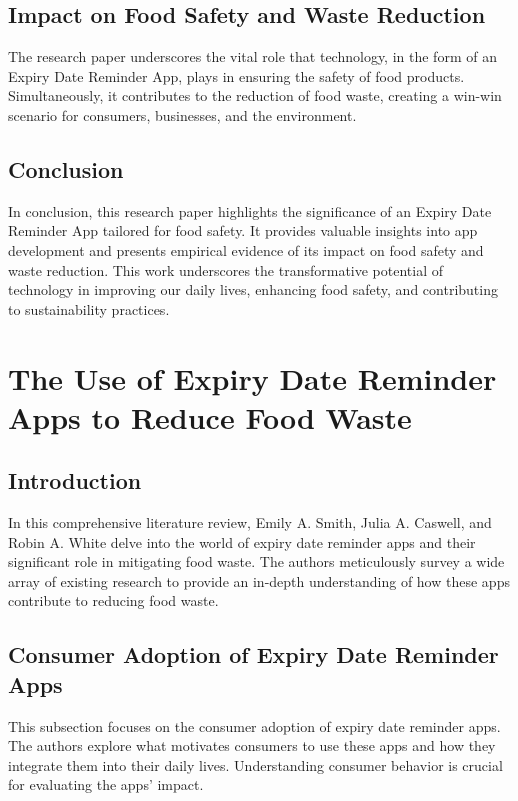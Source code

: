 \subsection{Impact on Food Safety and Waste Reduction}

The research paper underscores the vital role that technology, in the form of an Expiry Date Reminder App, plays in ensuring the safety of food products. Simultaneously, it contributes to the reduction of food waste, creating a win-win scenario for consumers, businesses, and the environment.

\subsection{Conclusion}

In conclusion, this research paper highlights the significance of an Expiry Date Reminder App tailored for food safety. It provides valuable insights into app development and presents empirical evidence of its impact on food safety and waste reduction. This work underscores the transformative potential of technology in improving our daily lives, enhancing food safety, and contributing to sustainability practices.



\section{The Use of Expiry Date Reminder Apps to Reduce Food Waste}

\subsection{Introduction}

In this comprehensive literature review, Emily A. Smith, Julia A. Caswell, and Robin A. White delve into the world of expiry date reminder apps and their significant role in mitigating food waste. The authors meticulously survey a wide array of existing research to provide an in-depth understanding of how these apps contribute to reducing food waste.

\subsection{Consumer Adoption of Expiry Date Reminder Apps}

This subsection focuses on the consumer adoption of expiry date reminder apps. The authors explore what motivates consumers to use these apps and how they integrate them into their daily lives. Understanding consumer behavior is crucial for evaluating the apps' impact.


